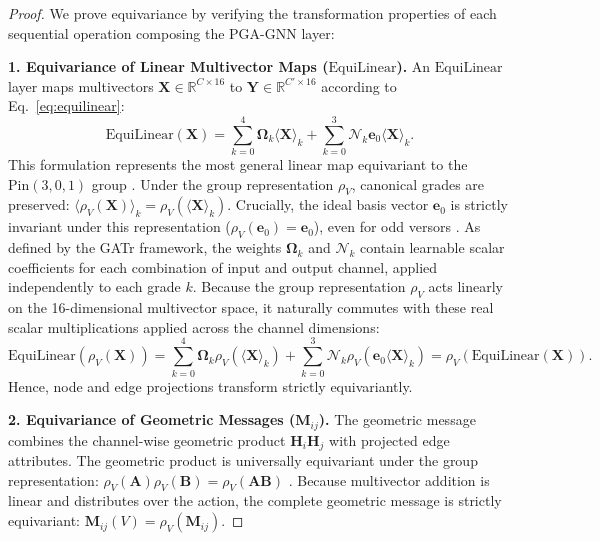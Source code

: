 \documentclass[10pt]{article}
\begin{document}
\begin{proof}
We prove equivariance by verifying the transformation properties of each sequential operation composing the PGA-GNN layer:

\noindent
\textbf{1. Equivariance of Linear Multivector Maps ($\mathrm{EquiLinear}$).}
An $\mathrm{EquiLinear}$ layer maps multivectors $\mathbf{X} \in \mathbb{R}^{C \times 16}$ to $\mathbf{Y} \in \mathbb{R}^{C' \times 16}$ according to Eq.~\ref{eq:equilinear}:
\begin{equation}
    \mathrm{EquiLinear}(\mathbf{X}) = \sum_{k=0}^{4} \boldsymbol{\Omega}_k \langle \mathbf{X} \rangle_k + \sum_{k=0}^{3} \boldsymbol{\mathcal{N}}_k \mathbf{e}_0 \langle \mathbf{X} \rangle_k.
\end{equation}
This formulation represents the most general linear map equivariant to the $\mathrm{Pin}(3,0,1)$ group \citep{gatr}. 
Under the group representation $\rho_V$, canonical grades are preserved: $\langle \rho_V(\mathbf{X}) \rangle_k = \rho_V(\langle \mathbf{X} \rangle_k)$. Crucially, the ideal basis vector $\mathbf{e}_0$ is strictly invariant under this representation ($\rho_V(\mathbf{e}_0) = \mathbf{e}_0$), even for odd versors \citep{gatr,pga4cs2020}. 
As defined by the GATr framework, the weights $\boldsymbol{\Omega}_k$ and $\boldsymbol{\mathcal{N}}_k$ contain learnable scalar coefficients for each combination of input and output channel, applied independently to each grade $k$. 
Because the group representation $\rho_V$ acts linearly on the 16-dimensional multivector space, it naturally commutes with these real scalar multiplications applied across the channel dimensions:
\begin{equation}
    \mathrm{EquiLinear}(\rho_V(\mathbf{X})) = \sum_{k=0}^{4} \boldsymbol{\Omega}_k \rho_V(\langle \mathbf{X} \rangle_k) + \sum_{k=0}^{3} \boldsymbol{\mathcal{N}}_k \rho_V(\mathbf{e}_0 \langle \mathbf{X} \rangle_k) = \rho_V\left(\mathrm{EquiLinear}(\mathbf{X})\right).
\end{equation}
Hence, node and edge projections transform strictly equivariantly.

\noindent
\textbf{2. Equivariance of Geometric Messages ($\mathbf{M}_{ij}$).}
The geometric message combines the channel-wise geometric product $\mathbf{H}_i \mathbf{H}_j$ with projected edge attributes. The geometric product is universally equivariant under the group representation: $\rho_V(\mathbf{A}) \rho_V(\mathbf{B}) = \rho_V(\mathbf{A} \mathbf{B})$ \citep{pga4cs2020}. 
Because multivector addition is linear and distributes over the action, the complete geometric message is strictly equivariant: $\mathbf{M}_{ij}(V) = \rho_V(\mathbf{M}_{ij})$.


\end{proof}
\end{document}
